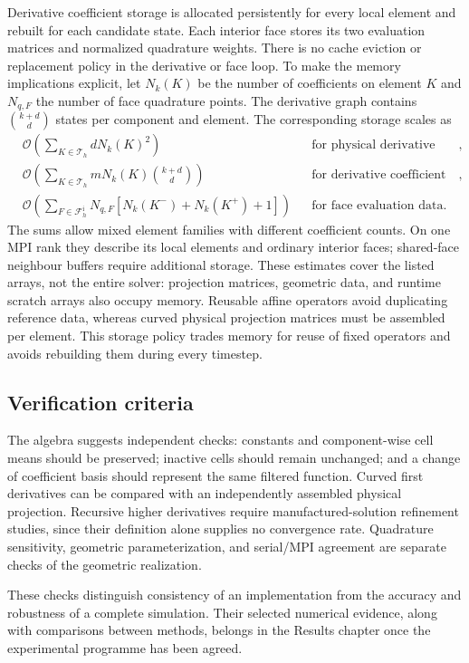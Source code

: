 Derivative coefficient storage is allocated persistently for every local
element and rebuilt for each candidate state. Each interior face stores
its two evaluation matrices and normalized quadrature weights. There is no
cache eviction or replacement policy in the derivative or face loop.
To make the memory implications explicit, let $N_k(K)$ be the number of
coefficients on element $K$ and $N_{q,F}$ the number of face quadrature
points. The derivative graph contains $\binom{k+d}{d}$ states per
component and element. The corresponding storage scales as
\begin{align}
 &\mathcal O\!\left(\sum_{K\in\mathcal T_h}dN_k(K)^2\right)
 &&\text{for physical derivative matrices},\\
 &\mathcal O\!\left(\sum_{K\in\mathcal T_h}mN_k(K)\binom{k+d}{d}\right)
 &&\text{for derivative coefficient states},\\
 &\mathcal O\!\left(\sum_{F\in\mathcal F_h^{\mathrm i}}N_{q,F}
       [N_k(K^-)+N_k(K^+)+1]\right)
 &&\text{for face evaluation data}.
\end{align}
The sums allow mixed element families with different coefficient counts.
On one MPI rank they describe its local elements and ordinary interior
faces; shared-face neighbour buffers require additional storage.
These estimates cover the listed arrays, not the entire solver: projection
matrices, geometric data, and runtime scratch arrays also occupy memory.
Reusable affine operators avoid duplicating reference data, whereas curved
physical projection matrices must be assembled per element. This storage
policy trades memory for reuse of fixed operators and avoids rebuilding
them during every timestep.

\subsection{Verification criteria}
\label{sec:verification-criteria}
The algebra suggests independent checks: constants and component-wise cell
means should be preserved; inactive cells should remain unchanged; and a
change of coefficient basis should represent the same filtered function.
Curved first derivatives can be compared with an independently assembled
physical projection. Recursive higher derivatives require manufactured-solution
refinement studies, since their definition alone supplies no convergence
rate. Quadrature sensitivity, geometric parameterization, and serial/MPI
agreement are separate checks of the geometric realization.

These checks distinguish consistency of an implementation from the accuracy
and robustness of a complete simulation. Their selected numerical evidence,
along with comparisons between methods, belongs in the Results chapter once
the experimental programme has been agreed.

